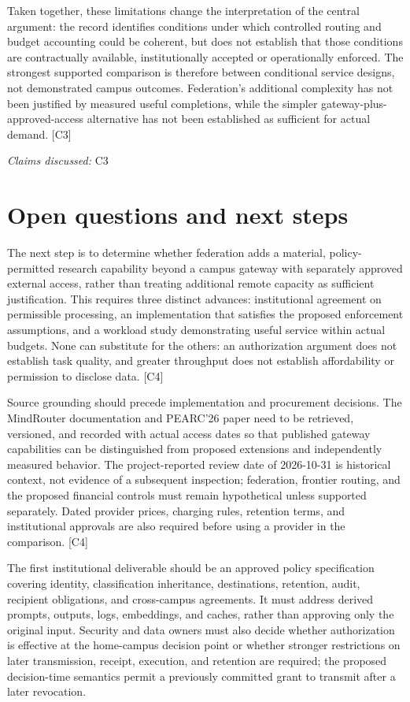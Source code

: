 \documentclass[11pt]{article}
\begin{document}
Taken together, these limitations change the interpretation of the central argument: the record identifies conditions under which controlled routing and budget accounting could be coherent, but does not establish that those conditions are contractually available, institutionally accepted or operationally enforced. The strongest supported comparison is therefore between conditional service designs, not demonstrated campus outcomes. Federation\textquoteright{}s additional complexity has not been justified by measured useful completions, while the simpler gateway-plus-approved-access alternative has not been established as sufficient for actual demand. [C3]

\textit{Claims discussed: }C3
\section{Open questions and next steps}
The next step is to determine whether federation adds a material, policy-permitted research capability beyond a campus gateway with separately approved external access, rather than treating additional remote capacity as sufficient justification. This requires three distinct advances: institutional agreement on permissible processing, an implementation that satisfies the proposed enforcement assumptions, and a workload study demonstrating useful service within actual budgets. None can substitute for the others: an authorization argument does not establish task quality, and greater throughput does not establish affordability or permission to disclose data. [C4]

Source grounding should precede implementation and procurement decisions. The MindRouter documentation and PEARC\textquoteright{}26 paper need to be retrieved, versioned, and recorded with actual access dates so that published gateway capabilities can be distinguished from proposed extensions and independently measured behavior. The project-reported review date of 2026-10-31 is historical context, not evidence of a subsequent inspection; federation, frontier routing, and the proposed financial controls must remain hypothetical unless supported separately. Dated provider prices, charging rules, retention terms, and institutional approvals are also required before using a provider in the comparison. [C4]

The first institutional deliverable should be an approved policy specification covering identity, classification inheritance, destinations, retention, audit, recipient obligations, and cross-campus agreements. It must address derived prompts, outputs, logs, embeddings, and caches, rather than approving only the original input. Security and data owners must also decide whether authorization is effective at the home-campus decision point or whether stronger restrictions on later transmission, receipt, execution, and retention are required; the proposed decision-time semantics permit a previously committed grant to transmit after a later revocation.
\end{document}
